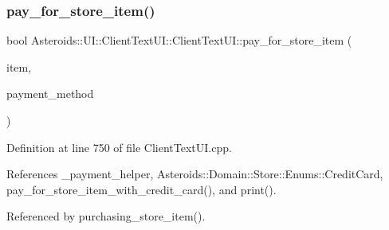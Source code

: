\subsubsection{\texorpdfstring{pay\+\_\+for\+\_\+store\+\_\+item()}{pay\_for\_store\_item()}}
{\footnotesize\ttfamily bool Asteroids\+::\+U\+I\+::\+Client\+Text\+U\+I\+::\+Client\+Text\+U\+I\+::pay\+\_\+for\+\_\+store\+\_\+item (\begin{DoxyParamCaption}\item[{std\+::shared\+\_\+ptr$<$ \hyperlink{classAsteroids_1_1Domain_1_1Store_1_1STORE__ITEM__INTERFACE}{Asteroids\+::\+Domain\+::\+Store\+::\+S\+T\+O\+R\+E\+\_\+\+I\+T\+E\+M\+\_\+\+I\+N\+T\+E\+R\+F\+A\+CE} $>$}]{item,  }\item[{\hyperlink{namespaceAsteroids_1_1Domain_1_1Store_1_1Enums_a0a0c269f6834cb8b1b6ed3bb02983564}{Asteroids\+::\+Domain\+::\+Store\+::\+Enums\+::\+Payment\+Method}}]{payment\+\_\+method }\end{DoxyParamCaption})\hspace{0.3cm}{\ttfamily [private]}}



Definition at line 750 of file Client\+Text\+U\+I.\+cpp.



References \+\_\+payment\+\_\+helper, Asteroids\+::\+Domain\+::\+Store\+::\+Enums\+::\+Credit\+Card, pay\+\_\+for\+\_\+store\+\_\+item\+\_\+with\+\_\+credit\+\_\+card(), and print().



Referenced by purchasing\+\_\+store\+\_\+item().

